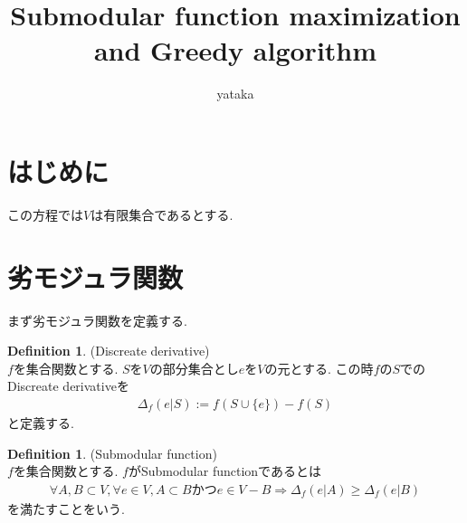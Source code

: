 \documentclass[11pt, a4paper, dvipdfmx]{jsarticle}
\title{Submodular function maximization and Greedy algorithm}
\author{yataka}
\theoremstyle{definition}
\newtheorem{Definition+}[Axiom+]{Definition}
\begin{document}
\maketitle
\section{はじめに}
この方程では$V$は有限集合であるとする.
\section{劣モジュラ関数}
まず劣モジュラ関数を定義する.
\begin{Definition+}(Discreate derivative)\\
    $f$を集合関数とする. $S$を$V$の部分集合とし$e$を$V$の元とする. この時$f$の$S$での
    Discreate derivativeを
    \begin{align*}
        \Delta_{f}(e | S) := f(S\cup\{e\}) - f(S)
    \end{align*}
    と定義する.
\end{Definition+}
\begin{Definition+}(Submodular function)\\
    $f$を集合関数とする. $f$がSubmodular functionであるとは
    \begin{align*}
        \forall A, B\subset V, \forall e\in V,A\subset B かつe\in V - B\Longrightarrow \Delta_{f}(e | A)\geq\Delta_{f}(e | B)
    \end{align*}
    を満たすことをいう.
\end{Definition+}
\end{document}
